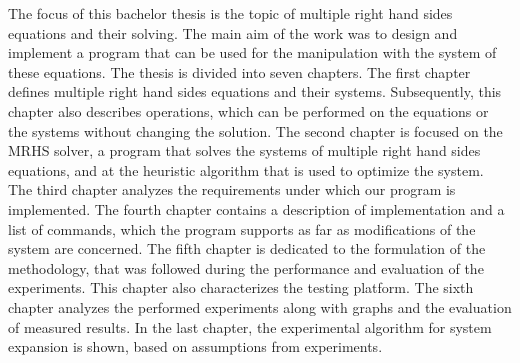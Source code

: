 The focus of this bachelor thesis is the topic of multiple right hand sides equations and their solving. The main aim of the work was to design and implement a program that can be used for the manipulation with the system of these equations. The thesis is divided into seven chapters. The first chapter defines multiple right hand sides equations and their systems. Subsequently, this chapter also describes operations, which can be performed on the equations or the systems without changing the solution. The second chapter is focused on the MRHS solver, a program that solves the systems of multiple right hand sides equations, and at the heuristic algorithm that is used to optimize the system. The third chapter analyzes the requirements under which our program is implemented. The fourth chapter contains a description of implementation and a list of commands, which the program supports as far as modifications of the system are concerned. The fifth chapter is dedicated to the formulation of the methodology, that was followed during the performance and evaluation of the experiments. This chapter also characterizes the testing platform. The sixth chapter analyzes the performed experiments along with graphs and the evaluation of measured results. In the last chapter, the experimental algorithm for system expansion is shown, based on assumptions from experiments.